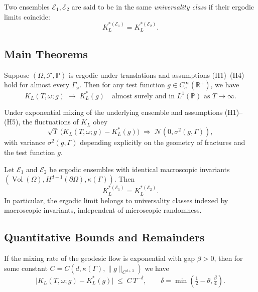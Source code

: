 \begin{definition}
Two ensembles $\mathcal{E}_1,\mathcal{E}_2$ are said to be in the same
\emph{universality class} if their ergodic limits coincide:
\[
    K_L^{*(\mathcal{E}_1)} = K_L^{*(\mathcal{E}_2)}.
\]
\end{definition}

\subsection*{Main Theorems}

\begin{theorem}
\label{thm:ergodic-LLN}
Suppose $(\Omega,\mathcal{F},\mathbb{P})$ is ergodic under translations and
assumptions (H1)--(H4) hold for almost every $\Gamma_\omega$. Then for any test
function $g\in C_c^\infty(\mathbb{R}^+)$, we have
\[
    K_L(T,\omega; g) \;\longrightarrow\; K_L^*(g)
    \quad \text{almost surely and in } L^1(\mathbb{P}) \text{ as } T\to\infty.
\]
\end{theorem}

\begin{theorem}
\label{thm:ergodic-CLT}
Under exponential mixing of the underlying ensemble and assumptions (H1)--(H5),
the fluctuations of $K_L$ obey
\[
    \sqrt{T}\,\big(K_L(T,\omega; g)-K_L^*(g)\big)
    \;\Longrightarrow\; \mathcal{N}(0,\sigma^2(g,\Gamma)),
\]
with variance $\sigma^2(g,\Gamma)$ depending explicitly on the geometry of
fractures and the test function $g$.
\end{theorem}

\begin{theorem}
\label{thm:ergodic-universality}
Let $\mathcal{E}_1$ and $\mathcal{E}_2$ be ergodic ensembles with identical
macroscopic invariants $(\operatorname{Vol}(\Omega), H^{d-1}(\partial\Omega),
\kappa(\Gamma))$. Then
\[
    K_L^{*(\mathcal{E}_1)} = K_L^{*(\mathcal{E}_2)}.
\]
In particular, the ergodic limit belongs to universality classes indexed by
macroscopic invariants, independent of microscopic randomness.
\end{theorem}

\subsection*{Quantitative Bounds and Remainders}

\begin{proposition}
If the mixing rate of the geodesic flow is exponential with gap $\beta>0$, then
for some constant $C=C(d,\kappa(\Gamma),\|g\|_{C^{d+3}})$ we have
\[
    \big|K_L(T,\omega; g)-K_L^*(g)\big|
    \;\leq\; C\, T^{-\delta}, \qquad
    \delta = \min\!\left(\tfrac{1}{2}-\theta, \tfrac{\beta}{4}\right).
\]
\end{proposition}

